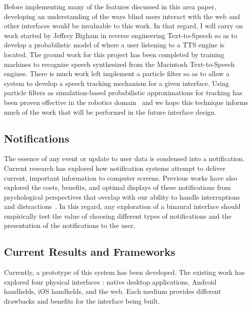 Before implementing many of the features discussed in this area paper,
developing an understanding of the ways blind users interact with the web and
other interfaces would be invaluable to this work.  In that regard, I will carry
on work started by Jeffrey Bigham in reverse engineering Text-to-Speech so as
to develop a probabilistic model of where a user listening to a TTS engine is
located.  The ground work for this project has been completed by training
machines to recognize speech synthesized from the Macintosh Text-to-Speech
engines.  There is much work left implement a particle filter so as to allow a
system to develop a speech tracking mechanism for a given interface. Using
particle filters as simulation-based probabilistic approximations for tracking
has been proven effective in the robotics domain~\cite{hightower2004particle}
and we hope this technique informs much of the work that will be performed in
the future interface design.


\subsection{                  Notifications                                  }

The essence of any event or update to user data is condensed into a
notification.  Current research has explored how notification systems attempt to
deliver current, important information to computer screens.  Previous works have
also explored the costs, benefits, and optimal displays of these notifications
from psychological perspectives that overlap with our ability to handle
interruptions and distractions~\cite{McCrickard2003509,
cutrell2001notification}. In this regard, any exploration of a binaural interface
should empirically test the value of choosing different types of notifications 
and the presentation of the notifications to the user.


\subsection{                  Current Results and Frameworks                  }

Currently, a prototype of this system has been developed.  The existing work
has explored four physical interfaces : native desktop applications, Android
handhelds, iOS handhelds, and the web. Each medium provides different drawbacks
and benefits for the interface being built.\\

